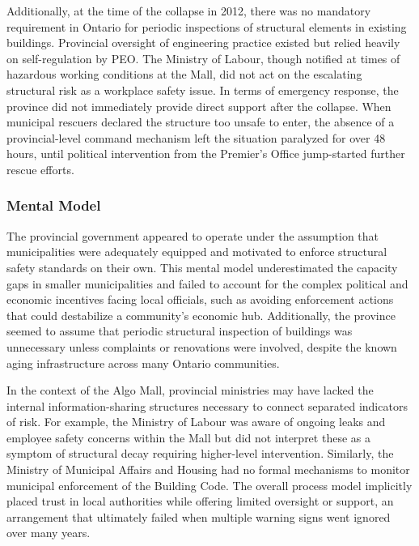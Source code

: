 \documentclass[12pt]{article}
\begin{document}
Additionally, at the time of the collapse in 2012, there was no mandatory requirement in Ontario for periodic inspections of structural elements in existing buildings. Provincial oversight of engineering practice existed but relied heavily on self-regulation by PEO. The Ministry of Labour, though notified at times of hazardous working conditions at the Mall, did not act on the escalating structural risk as a workplace safety issue. In terms of emergency response, the province did not immediately provide direct support after the collapse. When municipal rescuers declared the structure too unsafe to enter, the absence of a provincial-level command mechanism left the situation paralyzed for over 48 hours, until political intervention from the Premier's Office jump-started further rescue efforts.

\subsubsection*{Mental Model}
The provincial government appeared to operate under the assumption that municipalities were adequately equipped and motivated to enforce structural safety standards on their own. This mental model underestimated the capacity gaps in smaller municipalities and failed to account for the complex political and economic incentives facing local officials, such as avoiding enforcement actions that could destabilize a community's economic hub. Additionally, the province seemed to assume that periodic structural inspection of buildings was unnecessary unless complaints or renovations were involved, despite the known aging infrastructure across many Ontario communities.

In the context of the Algo Mall, provincial ministries may have lacked the internal information-sharing structures necessary to connect separated indicators of risk. For example, the Ministry of Labour was aware of ongoing leaks and employee safety concerns within the Mall but did not interpret these as a symptom of structural decay requiring higher-level intervention. Similarly, the Ministry of Municipal Affairs and Housing had no formal mechanisms to monitor municipal enforcement of the Building Code. The overall process model implicitly placed trust in local authorities while offering limited oversight or support, an arrangement that ultimately failed when multiple warning signs went ignored over many years.
\end{document}
